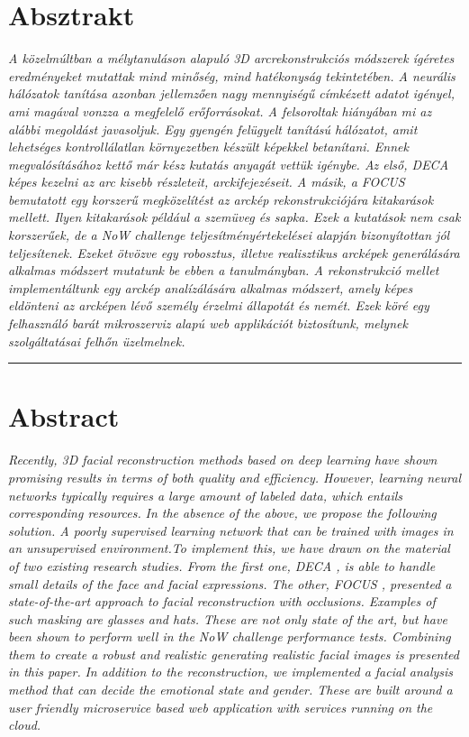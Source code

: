\documentclass[12pt,a4]{article}
\begin{document}
	\section*{Absztrakt}
     \emph{
		A közelmúltban a mélytanuláson alapuló 3D arcrekonstrukciós módszerek
		ígéretes eredményeket mutattak mind minőség, mind hatékonyság tekintetében. A neurális hálózatok tanítása azonban jellemzően nagy mennyiségű címkézett
		adatot igényel, ami magával vonzza a megfelelő erőforrásokat.
		A felsoroltak hiányában mi az alábbi megoldást javasoljuk. Egy gyengén
		felügyelt tanítású hálózatot, amit lehetséges kontrollálatlan környezetben készült képekkel betanítani.
		Ennek megvalósításához kettő már kész kutatás anyagát vettük igénybe. Az
		első, DECA \cite{deca} képes kezelni az arc kisebb részleteit, arckifejezéseit. A
		másik, a FOCUS \cite{focus} bemutatott egy korszerű megközelítést az arckép rekonstrukciójára kitakarások mellett. Ilyen kitakarások például a szemüveg és sapka. Ezek a kutatások nem csak korszerűek, de a NoW challenge teljesítményértekelései alapján bizonyítottan jól teljesítenek. Ezeket ötvözve egy robosztus, illetve realisztikus
		arcképek generálására alkalmas módszert mutatunk be ebben a tanulmányban.
		A rekonstrukció mellet implementáltunk egy arckép analízálására alkalmas módszert, amely képes eldönteni az arcképen lévő személy érzelmi
		állapotát és nemét. Ezek köré egy felhasználó barát mikroszerviz alapú web
		applikációt biztosítunk, melynek szolgáltatásai felhőn üzelmelnek.
		}
	\par\noindent\rule{\textwidth}{0.4pt}

    \section*{Abstract}
        \textit{Recently, 3D facial reconstruction methods based on deep learning have shown promising results in terms of both quality and efficiency. However, learning neural networks typically requires a large amount of labeled data, which entails corresponding resources.
        }
        \textit{In the absence of the above, we propose the following solution. A poorly supervised learning network that can be trained with images in an unsupervised environment.To implement this, we have drawn on the material of two existing research studies. From the first one, DECA \cite{deca}, is able to handle small details of the face and facial expressions. The other, FOCUS \cite{focus}, presented a state-of-the-art approach to facial reconstruction with occlusions. Examples of such masking are glasses and hats. These are not only state of the art, but have been shown to perform well in the NoW challenge performance tests. Combining them to create a robust and realistic generating realistic facial images is presented in this paper.}
        \textit{In addition to the reconstruction, we implemented a facial analysis method that can decide the emotional state and gender. These are built around a user friendly microservice based web application with services running on the cloud.}
     
\end{document}
